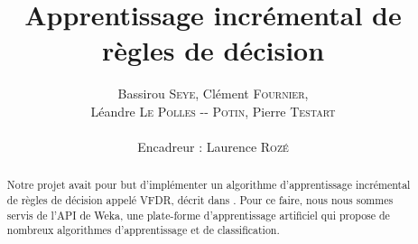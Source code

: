 \documentclass[a4paper,11pt]{article}
\title{ \textbf{Apprentissage incrémental de règles de décision} }
\author{Bassirou \textsc{Seye}, Clément \textsc{Fournier}, \\
        Léandre \textsc{Le Polles -{}- Potin}, Pierre \textsc{Testart} \\
        \\
        Encadreur : Laurence \textsc{Rozé}}
\date{}                    %
\begin{document}
          

    \maketitle                 %
    \thispagestyle{empty}      %

    \begin{abstract}

        Notre projet avait pour but d'implémenter un algorithme d'apprentissage incrémental de règles de décision appelé VFDR, décrit dans \cite{Gama-VFDR}. Pour ce faire, nous nous sommes servis de l’API de Weka, une plate-forme d'apprentissage artificiel qui propose de nombreux algorithmes d'apprentissage et de classification. 
        
    \end{abstract} 

    
    
    

    \nocite{*}
    
\end{document}
